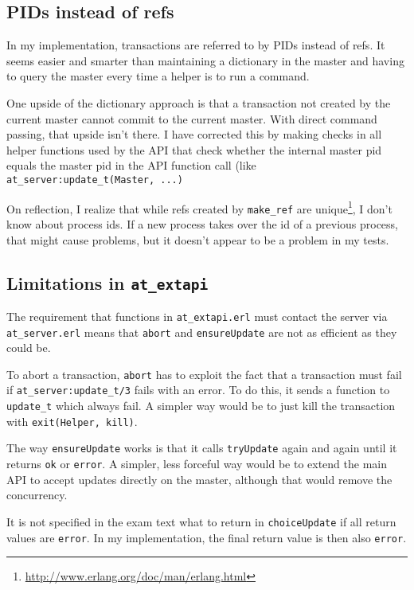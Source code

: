 \documentclass[10pt,a4paper]{article}
\begin{document}
\subsection{PIDs instead of refs}

In my implementation, transactions are referred to by PIDs instead of refs.  It
seems easier and smarter than maintaining a dictionary in the master and having
to query the master every time a helper is to run a command.

One upside of the dictionary approach is that a transaction not created by the
current master cannot commit to the current master.  With direct command
passing, that upside isn't there.  I have corrected this by making checks in all
helper functions used by the API that check whether the internal master pid
equals the master pid in the API function call (like
\verb+at_server:update_t(Master, ...)+

On reflection, I realize that while refs created by \verb+make_ref+ are
unique\footnote{\url{http://www.erlang.org/doc/man/erlang.html}}, I don't know
about process ids.  If a new process takes over the id of a previous process,
that might cause problems, but it doesn't appear to be a problem in my tests.


\subsection{Limitations in \texttt{at\_extapi}}

The requirement that functions in \verb+at_extapi.erl+ must contact the server
via \verb+at_server.erl+ means that \verb+abort+ and \verb+ensureUpdate+ are not
as efficient as they could be.

To abort a transaction, \verb+abort+ has to exploit the fact that a transaction
must fail if \verb+at_server:update_t/3+ fails with an error.  To do this, it
sends a function to \verb+update_t+ which always fail.  A simpler way would be
to just kill the transaction with \verb+exit(Helper, kill)+.

The way \verb+ensureUpdate+ works is that it calls \verb+tryUpdate+ again and
again until it returns \verb+ok+ or \verb+error+.  A simpler, less forceful way
would be to extend the main API to accept updates directly on the master,
although that would remove the concurrency.

It is not specified in the exam text what to return in \verb+choiceUpdate+ if
all return values are \verb+error+.  In my implementation, the final return
value is then also \verb+error+.
\end{document}
